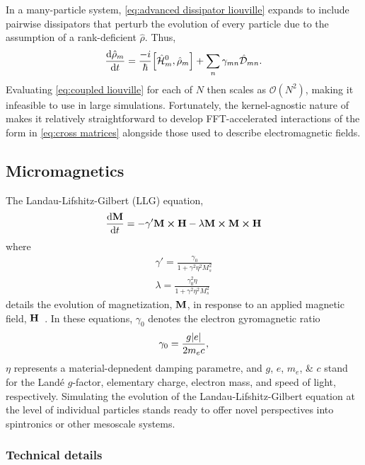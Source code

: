 In a many-particle system, \cref{eq:advanced dissipator liouville} expands to include  pairwise dissipators that perturb the evolution of every particle due to the assumption of a rank-deficient $\hat{\rho}$.
Thus,
\begin{equation}
  \dv{\hat\rho_m}{t} = \frac{-i}{\hbar} \commutator{\hat{\mathcal{H}}_m^0}{\hat{\rho}_m} + \sum_{n} \gamma_{mn} \hat{\mathcal{D}}_{mn}.
  \label{eq:coupled liouville}
\end{equation}
Evaluating \cref{eq:coupled liouville} for each of $N$ then scales as $\mathcal{O}(N^2)$, making it infeasible to use in large simulations.
Fortunately, the kernel-agnostic nature of \QuEST{} makes it relatively straightforward to develop FFT-accelerated interactions of the form in \cref{eq:cross matrices} alongside those used to describe electromagnetic fields.

\subsection{Micromagnetics}

The Landau-Lifshitz-Gilbert (LLG) equation,
\begin{equation}
  \dv{\vb{M}}{t} = -\gamma' \vb{M} \cp \vb{H} - \lambda \vb{M} \cp \vb{M} \cp \vb{H}
  \label{eq:llg}
\end{equation}
where
\begin{subequations}
\begin{align}
  \gamma' = \frac{\gamma_0}{1 + \gamma^2 \eta^2 M_s^2} \\
  \lambda = \frac{\gamma_0^2 \eta}{1 + \gamma^2 \eta^2  M_s^2}
\end{align}
\end{subequations}
details the evolution of magnetization, $\vb{M}$, in response to an applied magnetic field, $\vb{H}$~\cite{Aharoni2000}.
In these equations, $\gamma_0$ denotes the electron gyromagnetic ratio
\begin{equation}
  \gamma_0 = \frac{g \abs{e}}{2 m_e c},
  \label{eq:gyro}
\end{equation}
$\eta$ represents a material-depnedent damping parametre, and $g$, $e$, $m_e$, \& $c$ stand for the Land\'e $g$-factor, elementary charge, electron mass, and speed of light, respectively.
Simulating the evolution of the Landau-Lifshitz-Gilbert equation at the level of individual particles stands ready to offer novel perspectives into spintronics or other mesoscale systems.

\subsubsection{Technical details}

